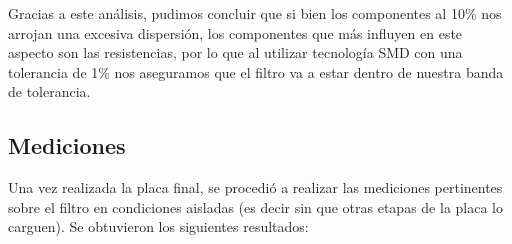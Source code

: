 \documentclass[../../ASSD_TP1_G7.tex]{subfiles}
\begin{document}
Gracias a este análisis, pudimos concluir que si bien los componentes
al 10\% nos arrojan una excesiva dispersión, los componentes que más
influyen en este aspecto son las resistencias, por lo que al utilizar
tecnología SMD con una tolerancia de 1\% nos aseguramos que el filtro
va a estar dentro de nuestra banda de tolerancia.

\subsection{Mediciones}
Una vez realizada la placa final, se procedió a realizar las mediciones pertinentes sobre el filtro en condiciones aisladas (es decir sin que otras etapas de la placa lo carguen). Se obtuvieron los siguientes resultados:

\begin{figure}

\end{figure}
\end{document}

